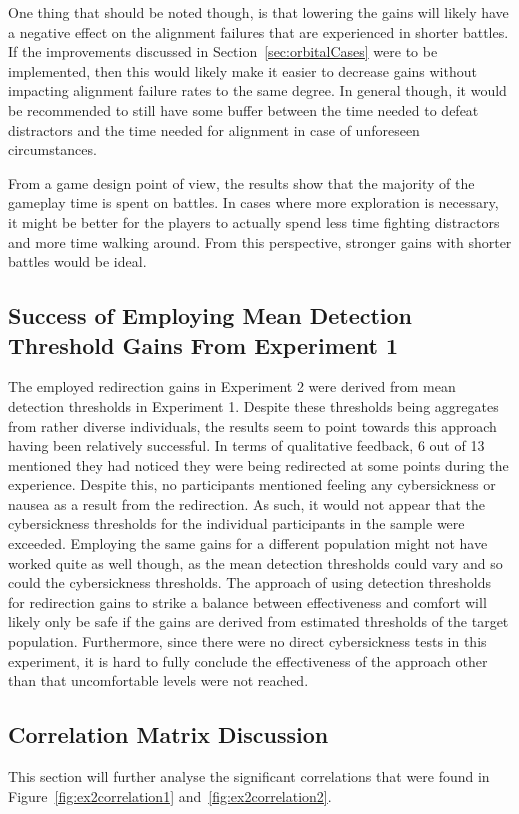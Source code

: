 One thing that should be noted though, is that lowering the gains will likely have a negative effect on the alignment failures that are experienced in shorter battles. If the improvements discussed in Section~\ref{sec:orbitalCases} were to be implemented, then this would likely make it easier to decrease gains without impacting alignment failure rates to the same degree. In general though, it would be recommended to still have some buffer between the time needed to defeat distractors and the time needed for alignment in case of unforeseen circumstances.
   
From a game design point of view, the results show that the majority of the gameplay time is spent on battles. In cases where more exploration is necessary, it might be better for the players to actually spend less time fighting distractors and more time walking around. From this perspective, stronger gains with shorter battles would be ideal. 
   
\subsection{Success of Employing Mean Detection Threshold Gains From Experiment 1}
The employed redirection gains in Experiment 2 were derived from mean detection thresholds in Experiment 1. Despite these thresholds being aggregates from rather diverse individuals, the results seem to point towards this approach having been relatively successful. In terms of qualitative feedback, 6 out of 13 mentioned they had noticed they were being redirected at some points during the experience. Despite this, no participants mentioned feeling any cybersickness or nausea as a result from the redirection. As such, it would not appear that the cybersickness thresholds for the individual participants in the sample were exceeded. Employing the same gains for a different population might not have worked quite as well though, as the mean detection thresholds could vary and so could the cybersickness thresholds. The approach of using detection thresholds for redirection gains to strike a balance between effectiveness and comfort will likely only be safe if the gains are derived from estimated thresholds of the target population. Furthermore, since there were no direct cybersickness tests in this experiment, it is hard to fully conclude the effectiveness of the approach other than that uncomfortable levels were not reached.  

\subsection{Correlation Matrix Discussion}\label{sec:ex2correlationAnalysis}
This section will further analyse the significant correlations that were found in Figure~\ref{fig:ex2correlation1} and~\ref{fig:ex2correlation2}. 

